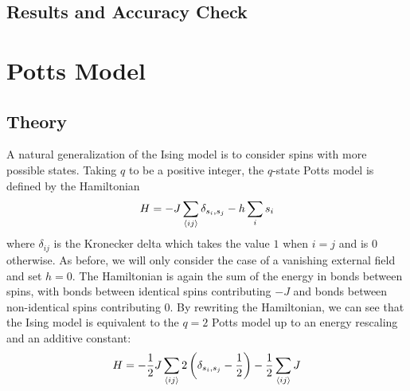 \documentclass[twocolumn,aps,prl]{revtex4-1} %
\begin{document}
\subsection{Results and Accuracy Check}






\section{Potts Model}
\subsection{Theory}
A natural generalization of the Ising model is to consider spins with more possible states. Taking $q$ to be a positive integer, the $q$-state Potts model is defined by the Hamiltonian
\begin{equation}
	H = -J\sum_{\braket{ij}}\delta_{s_i,s_j} - h\sum_{i}s_i
\end{equation}
where $\delta_{ij}$ is the Kronecker delta which takes the value $1$ when $i = j$ and is 0 otherwise. As before, we will only consider the case of a vanishing external field and set $h = 0$. The Hamiltonian is again the sum of the energy in bonds between spins, with bonds between identical spins contributing $-J$ and bonds between non-identical spins contributing 0. By rewriting the Hamiltonian, we can see that the Ising model is equivalent to the $q = 2$ Potts model up to an energy rescaling and an additive constant:
\begin{equation}
	H = -\frac{1}{2}J\sum_{\braket{ij}}2\left(\delta_{s_i,s_j} - \frac{1}{2}\right) - \frac{1}{2}\sum_{\braket{ij}}J
\end{equation}
\end{document}
